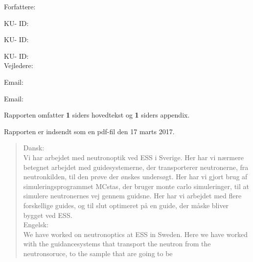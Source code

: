 \documentclass[12pt,oneside,a4paper]{article}
\begin{document}
\vfill
{\large Forfattere:}\\
{\large \hspace*{1cm}   \hspace{1cm} KU- ID:  \\
{\large \hspace*{1cm}    \hspace{1cm} KU- ID:  \\
{\large \hspace*{1cm}    \hspace{1cm} KU- ID:  \\ 
        
{\large Vejledere:}\\
{\large \hspace*{1cm}   \hspace{1cm} Email:  \\
{\large \hspace*{1cm}     \hspace{1cm} Email:  \\

\vfill

{\large Rapporten omfatter {\bf 1} siders hovedtekst og {\bf 1} siders appendix.}

{\large Rapporten er indsendt som en pdf-fil den 17 marts 2017. }

\normalsize

\newpage

\begin{abstract}


Dansk:
\\
Vi har arbejdet med neutronoptik ved ESS i Sverige. Her har vi nærmere betegnet arbejdet med guidesystemerne, der transporterer neutronerne, fra neutronkilden, til den prøve der ønskes undersøgt. Her har vi gjort brug af simuleringsprogrammet MCstas, der bruger monte carlo simuleringer, til at simulere neutronernes vej gennem guidsne. Her har vi arbejdet med flere forskellige guides, og til slut optimeret på en guide, der måske bliver bygget ved ESS. \\

Engelsk:
\\
We have worked on neutronoptics at ESS in Sweden. Here we have worked with the guidancesystems that transport the neutron from the neutronsoruce, to the sample that are going to be 
\end{abstract}

}}}}}
\end{document}
